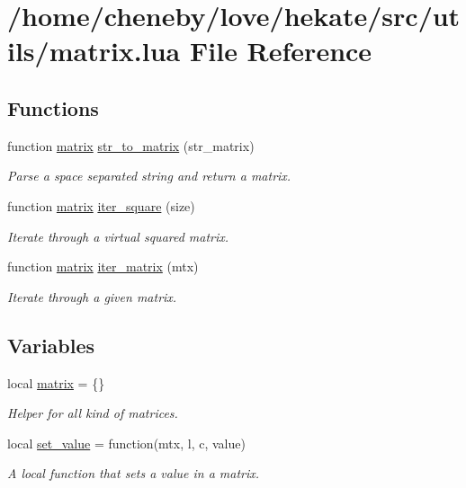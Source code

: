 \hypertarget{matrix_8lua}{\section{/home/cheneby/love/hekate/src/utils/matrix.lua File Reference}
\label{matrix_8lua}
}
\subsection*{Functions}
\begin{DoxyCompactItemize}
\item 
function \hyperlink{matrix_8lua_af18b890fa1eb240e9244c2d4d742a110}{matrix} \hyperlink{matrix_8lua_a3d70c1d8a065acad9a9172bf273eb913}{str\-\_\-to\-\_\-matrix} (str\-\_\-matrix)
\begin{DoxyCompactList}\small\item\em Parse a space separated string and return a matrix. \end{DoxyCompactList}\item 
function \hyperlink{matrix_8lua_af18b890fa1eb240e9244c2d4d742a110}{matrix} \hyperlink{matrix_8lua_aa656cf44fd2f4eb95945a52986ffa947}{iter\-\_\-square} (size)
\begin{DoxyCompactList}\small\item\em Iterate through a virtual squared matrix. \end{DoxyCompactList}\item 
function \hyperlink{matrix_8lua_af18b890fa1eb240e9244c2d4d742a110}{matrix} \hyperlink{matrix_8lua_a5bf94c0bfa8422fee396054ac4a2f752}{iter\-\_\-matrix} (mtx)
\begin{DoxyCompactList}\small\item\em Iterate through a given matrix. \end{DoxyCompactList}\end{DoxyCompactItemize}
\subsection*{Variables}
\begin{DoxyCompactItemize}
\item 
local \hyperlink{matrix_8lua_af18b890fa1eb240e9244c2d4d742a110}{matrix} = \{\}
\begin{DoxyCompactList}\small\item\em Helper for all kind of matrices. \end{DoxyCompactList}\item 
local \hyperlink{matrix_8lua_a66c1d1ca9853fe7142b09707397e5ac2}{set\-\_\-value} = function(mtx, l, c, value)
\begin{DoxyCompactList}\small\item\em A local function that sets a value in a matrix. \end{DoxyCompactList}\end{DoxyCompactItemize}


